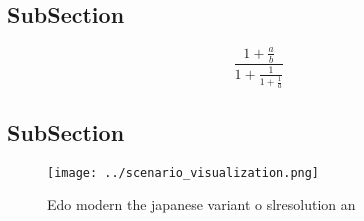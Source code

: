 \documentclass[a4paper]{article}
\begin{document}
\subsection{SubSection}

\[ \frac{1+\frac{a}{b}}{1+\frac{1}{1+\frac{1}{a}}} \]

\subsection{SubSection}

\begin{figure}
\centering
\texttt{[image: ../scenario\_visualization.png]}
\caption{Edo modern the japanese variant o slresolution an
}
\end{figure}
 
\end{document}
